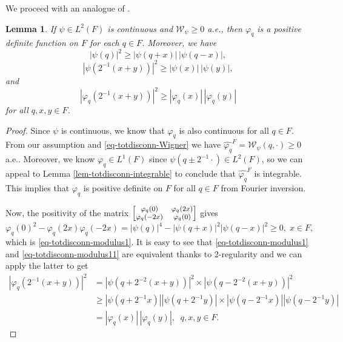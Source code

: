 \documentclass[12pt,reqno]{amsart}
\newtheorem{lem}[thm]{Lemma}
\theoremstyle{definition}
\theoremstyle{definition}
\theoremstyle{definition}
\numberwithin{thm}{section}
\numberwithin{equation}{section}
\begin{document}
We proceed with an analogue of \cite[Lemma 11]{Gro}.

\begin{lem} \label{lem-totdisconn-Hudson1} If $\psi \in L^2(F)$ is continuous and $\mathcal{W}_{\psi}\geq 0$ a.e., then
$\varphi_q$ is a positive definite function on $F$ for each $q \in F$. Moreover, we have
\begin{equation}\label{eq-totdisconn-modulus1}
    |\psi(q)|^2\geq |\psi(q+x)|\,|\psi(q-x)|,
\end{equation}
\begin{equation}\label{eq-totdisconn-modulus11}
    |\psi(2^{-1}(x+y))|^2\geq |\psi(x)|\,|\psi(y)|,
\end{equation}
and
\begin{equation}\label{eq-totdisconn-modulus2}
    |\varphi_q(2^{-1}(x+y))|^2\geq |\varphi_q(x)|\,|\varphi_q(y)|
\end{equation}
for all $q,x,y\in F$.
\end{lem}
\begin{proof}
Since $\psi$ is continuous, we know that $\varphi_q$ is also continuous for all $q\in F$. From our assumption and \eqref{eq-totdisconn-Wigner} we have $\widehat{\varphi_q}^F = \mathcal{W}_{\psi}(q,\cdot) \geq 0$ a.e.. Moreover, we know $\varphi_q\in L^1(F)$ since $\psi(q\pm 2^{-1}\cdot)\in L^2(F)$, so we can appeal to Lemma \ref{lem-totdisconn-integrable} to conclude that $\widehat{\varphi_q}^F$ is integrable. This implies  that $\varphi_q$ is positive definite on $F$ for all $q\in F$ from Fourier inversion.

Now, the positivity of the matrix $\footnotesize\begin{bmatrix} \varphi_q(0) & \varphi_q(2x) \\ \varphi_q(-2x) & \varphi_q(0) \end{bmatrix}$ gives
    $$\varphi_q(0)^2-\varphi_q(2x)\varphi_q(-2x)=|\psi(q)|^4-|\psi(q+x)|^2|\psi(q-x)|^2\geq 0,\; x\in F,$$
which is \eqref{eq-totdisconn-modulus1}. It is easy to see that \eqref{eq-totdisconn-modulus1} and \eqref{eq-totdisconn-modulus11} are equivalent thanks to 2-regularity and we can apply the latter to get
\begin{align*}
    |\varphi_q(2^{-1}(x+y))|^2&=|\psi(q+2^{-2}(x+y))|^2\times |\psi(q-2^{-2}(x+y))|^2\\
    &\geq |\psi(q+2^{-1}x)||\psi(q+2^{-1}y)|\times|\psi(q-2^{-1}x)||\psi(q-2^{-1}y)|\\ &=|\varphi_q(x)|\,|\varphi_q(y)|,\;\;q,x,y\in F.
\end{align*}
\end{proof}
\end{document}
